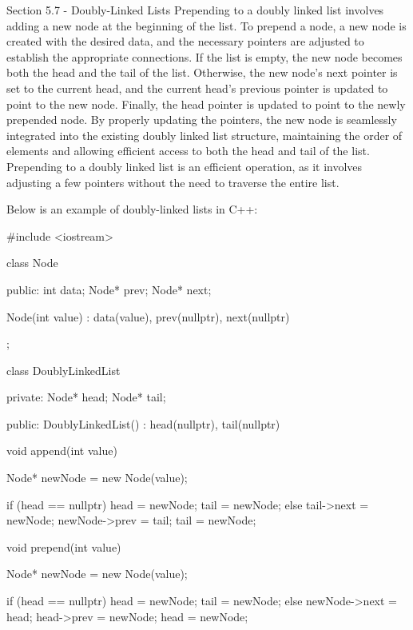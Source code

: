 \begin{notes}{Section 5.7 - Doubly-Linked Lists}
    Prepending to a doubly linked list involves adding a new node at the beginning of the list. To prepend a node, a new node is created with the desired data, and the necessary pointers are adjusted to establish the appropriate connections. If the list is empty, the new node becomes both the head and the 
    tail of the list. Otherwise, the new node's next pointer is set to the current head, and the current head's previous pointer is updated to point to the new node. Finally, the head pointer is updated to point to the newly prepended node. By properly updating the pointers, the new node is seamlessly integrated 
    into the existing doubly linked list structure, maintaining the order of elements and allowing efficient access to both the head and tail of the list. Prepending to a doubly linked list is an efficient operation, as it involves adjusting a few pointers without the need to traverse the entire list.
    
    \begin{highlight}
        Below is an example of doubly-linked lists in C++:
    
    \begin{code}[C++]
    #include <iostream>

    class Node {
    public:
        int data;
        Node* prev;
        Node* next;

        Node(int value) : data(value), prev(nullptr), next(nullptr) {}
    };

    class DoublyLinkedList {
    private:
        Node* head;
        Node* tail;

    public:
        DoublyLinkedList() : head(nullptr), tail(nullptr) {}

        void append(int value) {
            Node* newNode = new Node(value);

            if (head == nullptr) {
                head = newNode;
                tail = newNode;
            } else {
                tail->next = newNode;
                newNode->prev = tail;
                tail = newNode;
            }
        }

        void prepend(int value) {
            Node* newNode = new Node(value);

            if (head == nullptr) {
                head = newNode;
                tail = newNode;
            } else {
                newNode->next = head;
                head->prev = newNode;
                head = newNode;
            }
        }

}
\end{code}
\end{highlight}
\end{notes}
